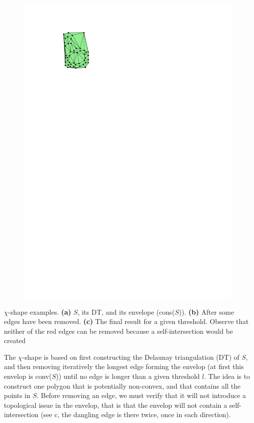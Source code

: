 \begin{marginfigure}
\begin{subfigure}[b]{0.6\linewidth}
    \includegraphics[page=3,width=\textwidth]{figs/chishape.pdf}
    \caption{}
  \end{subfigure}
\caption{$\chi$-shape examples. \textbf{(a)} $S$, its DT, and its envelope (cons($S$)). \textbf{(b)} After some edges have been removed. \textbf{(c)} The final result for a given threshold. Observe that neither of the red edges can be removed because a self-intersection would be created}%
\end{marginfigure}

The $\chi$-shape is based on first constructing the Delaunay triangulation (DT) of $S$, and then removing iteratively the longest edge forming the envelop (at first this envelop is conv($S$)) until no edge is longer than a given threshold $l$.
The idea is to construct one polygon that is potentially non-convex, and that contains all the points in $S$.
Before removing an edge, we must verify that it will not introduce a topological issue in the envelop, that is that the envelop will not contain a self-intersection (see c, the dangling edge is there twice, once in each direction). 

